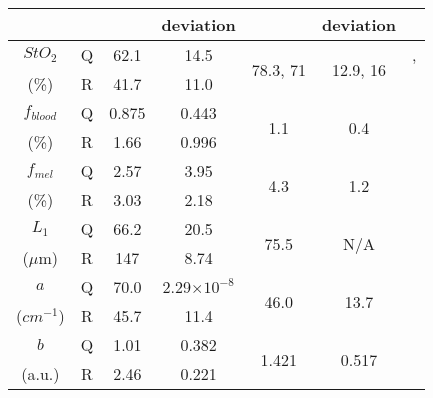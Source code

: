 \begin{subappendices}
\begin{table}[h]
\begin{tabular}{|c|ccc|ccc|}
         & &  & deviation &  & deviation &  \\
        \hline
        $StO_2$ & Q & 62.1 & 14.5 & \multirow{2}{*}{78.3, 71} & \multirow{2}{*}{12.9, 16} & \cite{VanManen2021}, \\ %
        (\%) & R & 41.7 & 11.0 & & & \cite{Nishidate2011} \\ %
        \hline
        $f_{blood}$ & Q & 0.875 & 0.443 & \multirow{2}{*}{1.1} & \multirow{2}{*}{0.4} & \multirow{2}{*}{\cite{Nishidate2011}} \\ %
        (\%) & R & 1.66 & 0.996 & & & \\
        \hline
        $f_{mel}$ & Q & 2.57 & 3.95 & \multirow{2}{*}{4.3} & \multirow{2}{*}{1.2} & \multirow{2}{*}{\cite{Nishidate2011}} \\ %
        (\%) & R & 3.03 & 2.18 & & &  \\
        \hline
        $L_1$ & Q & 66.2 & 20.5 & \multirow{2}{*}{75.5} & \multirow{2}{*}{N/A} & \multirow{2}{*}{\cite{Lintzeri2022}} \\ %
        ($\mu$m) & R & 147 & 8.74 & & &  \\
        \hline
        $a$ & Q & 70.0 & 2.29$\times 10^{-8}$ & \multirow{2}{*}{46.0} & \multirow{2}{*}{13.7} & \multirow{2}{*}{\cite{Jacques2013}} \\ %
        (\textrm{$cm^{-1}$}) & R & 45.7 & 11.4 & & &  \\
        \hline
        $b$ & Q & 1.01 & 0.382 & \multirow{2}{*}{1.421} & \multirow{2}{*}{0.517} & \multirow{2}{*}{\cite{Jacques2013}} \\ %
        (a.u.) & R & 2.46 & 0.221 & & &  \\
        \hline
    \end{tabular}
    \label{tb:NISTparamsuniform}
\end{table}
\end{subappendices}